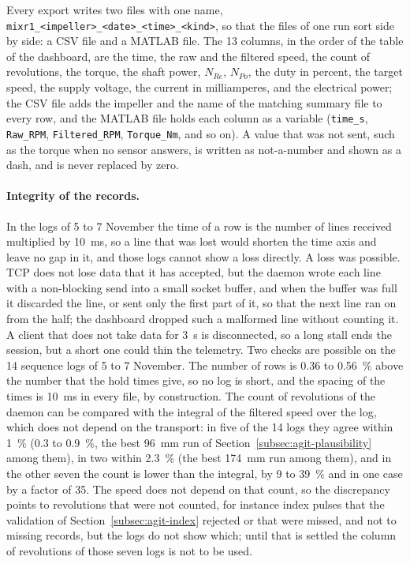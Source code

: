 Every export writes two files with one name, \texttt{mixr1\_<impeller>\_<date>\_<time>\_<kind>}, so that the files of one run sort side by side: a CSV file and a MATLAB file. The 13 columns, in the order of the table of the dashboard, are the time, the raw and the filtered speed, the count of revolutions, the torque, the shaft power, $N_{Re}$, $N_{Po}$, the duty in percent, the target speed, the supply voltage, the current in milliamperes, and the electrical power; the CSV file adds the impeller and the name of the matching summary file to every row, and the MATLAB file holds each column as a variable (\texttt{time\_s}, \texttt{Raw\_RPM}, \texttt{Filtered\_RPM}, \texttt{Torque\_Nm}, and so on). A value that was not sent, such as the torque when no sensor answers, is written as not-a-number and shown as a dash, and is never replaced by zero.

\paragraph{Integrity of the records.}
In the logs of 5 to 7 November the time of a row is the number of lines received multiplied by 10~ms, so a line that was lost would shorten the time axis and leave no gap in it, and those logs cannot show a loss directly. A loss was possible. TCP does not lose data that it has accepted, but the daemon wrote each line with a non-blocking send into a small socket buffer, and when the buffer was full it discarded the line, or sent only the first part of it, so that the next line ran on from the half; the dashboard dropped such a malformed line without counting it. A client that does not take data for 3~s is disconnected, so a long stall ends the session, but a short one could thin the telemetry. Two checks are possible on the 14 sequence logs of 5 to 7 November. The number of rows is 0.36 to 0.56~\% above the number that the hold times give, so no log is short, and the spacing of the times is 10~ms in every file, by construction. The count of revolutions of the daemon can be compared with the integral of the filtered speed over the log, which does not depend on the transport: in five of the 14 logs they agree within 1~\% (0.3 to 0.9~\%, the best 96~mm run of Section~\ref{subsec:agit-plausibility} among them), in two within 2.3~\% (the best 174~mm run among them), and in the other seven the count is lower than the integral, by 9 to 39~\% and in one case by a factor of 35. The speed does not depend on that count, so the discrepancy points to revolutions that were not counted, for instance index pulses that the validation of Section~\ref{subsec:agit-index} rejected or that were missed, and not to missing records, but the logs do not show which; until that is settled the column of revolutions of those seven logs is not to be used.

